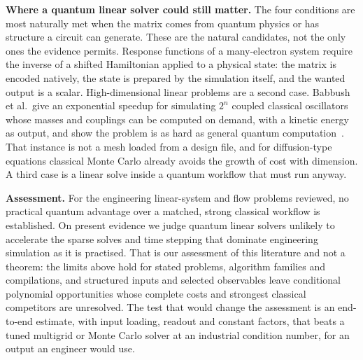 \textbf{Where a quantum linear solver could still matter.} The four conditions are most naturally met when the matrix comes from quantum physics or has structure a circuit can generate. These are the natural candidates, not the only ones the evidence permits. Response functions of a many-electron system require the inverse of a shifted Hamiltonian applied to a physical state: the matrix is encoded natively, the state is prepared by the simulation itself, and the wanted output is a scalar. High-dimensional linear problems are a second case. Babbush et al.\ give an exponential speedup for simulating $2^n$ coupled classical oscillators whose masses and couplings can be computed on demand, with a kinetic energy as output, and show the problem is as hard as general quantum computation~\cite{babbush2023osc}. That instance is not a mesh loaded from a design file, and for diffusion-type equations classical Monte Carlo already avoids the growth of cost with dimension. A third case is a linear solve inside a quantum workflow that must run anyway.

\textbf{Assessment.} For the engineering linear-system and flow problems reviewed, no practical quantum advantage over a matched, strong classical workflow is established. On present evidence we judge quantum linear solvers unlikely to accelerate the sparse solves and time stepping that dominate engineering simulation as it is practised. That is our assessment of this literature and not a theorem: the limits above hold for stated problems, algorithm families and compilations, and structured inputs and selected observables leave conditional polynomial opportunities whose complete costs and strongest classical competitors are unresolved. The test that would change the assessment is an end-to-end estimate, with input loading, readout and constant factors, that beats a tuned multigrid or Monte Carlo solver at an industrial condition number, for an output an engineer would use.


